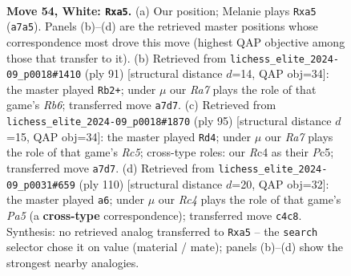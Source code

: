 \documentclass[11pt]{article}
\begin{document}
\clearpage

\begin{figure}[p]\centering
\begin{subfigure}{0.46\textwidth}\centering
\resizebox{\linewidth}{!}{%
\newchessgame
\chessboard[
  setfen={8/R4p2/4pk2/p7/P1R1P3/5P1r/4K3/8 w - - 0 54},
  showmover=false,
  pgfstyle=straightmove, color=movearrow, markmove={a7-a5}
]}
\caption{}
\end{subfigure}\hfill
\begin{subfigure}{0.46\textwidth}\centering
\resizebox{\linewidth}{!}{%
\newchessgame
\chessboard[
  setfen={8/8/3r1k2/2R2pp1/3p4/1r1P2P1/4KP2/8 b - - 1 46},
  showmover=false,
  pgfstyle=straightmove, color=movearrow, markmove={b3-b2}
]}
\caption{}
\end{subfigure}
\\[4pt]
\begin{subfigure}{0.46\textwidth}\centering
\resizebox{\linewidth}{!}{%
\newchessgame
\chessboard[
  setfen={8/4kp2/8/2p1PK2/1pr2P2/8/2P4R/8 b - - 1 48},
  showmover=false,
  pgfstyle=straightmove, color=movearrow, markmove={c4-d4}
]}
\caption{}
\end{subfigure}\hfill
\begin{subfigure}{0.46\textwidth}\centering
\resizebox{\linewidth}{!}{%
\newchessgame
\chessboard[
  setfen={5k2/R4p2/6p1/P3P1Pp/5P1r/5K2/8/8 w - - 1 56},
  showmover=false,
  pgfstyle=straightmove, color=movearrow, markmove={a5-a6}
]}
\caption{}
\end{subfigure}
\caption{\textbf{Move 54, White: \texttt{Rxa5}.} (a) Our position; Melanie plays \texttt{Rxa5} (\texttt{a7a5}). Panels (b)--(d) are the retrieved master positions whose correspondence most drove this move (highest QAP objective among those that transfer to it). (b) Retrieved from \texttt{lichess\_elite\_2024-09\_p0018\#1410} (ply 91) [structural distance $d$=14, QAP obj=34]: the master played \texttt{Rb2+}; under $\mu$ our \emph{Ra7} plays the role of that game's \emph{Rb6}; transferred move \texttt{a7d7}. (c) Retrieved from \texttt{lichess\_elite\_2024-09\_p0018\#1870} (ply 95) [structural distance $d$=15, QAP obj=34]: the master played \texttt{Rd4}; under $\mu$ our \emph{Ra7} plays the role of that game's \emph{Rc5}; cross-type roles: our \emph{R}c4 as their \emph{P}c5; transferred move \texttt{a7d7}. (d) Retrieved from \texttt{lichess\_elite\_2024-09\_p0031\#659} (ply 110) [structural distance $d$=20, QAP obj=32]: the master played \texttt{a6}; under $\mu$ our \emph{Rc4} plays the role of that game's \emph{Pa5} (a \textbf{cross-type} correspondence); transferred move \texttt{c4c8}. Synthesis: no retrieved analog transferred to \texttt{Rxa5} -- the \texttt{search} selector chose it on value (material / mate); panels (b)--(d) show the strongest nearby analogies.}
\label{fig:thought-m106}
\end{figure}
\end{document}
